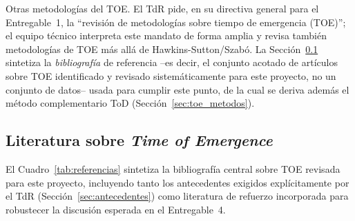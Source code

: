 \documentclass[11pt,a4paper]{article}
\begin{document}
Otras metodolog\'ias del TOE. El TdR pide, en su directiva general para el Entregable~1, la ``revisi\'on de metodolog\'ias sobre tiempo de emergencia (TOE)''; el equipo t\'ecnico interpreta este mandato de forma amplia y revisa tambi\'en metodolog\'ias de TOE m\'as all\'a de Hawkins-Sutton/Szab\'o. La Secci\'on~\ref{sec:referencias} sintetiza la \emph{bibliograf\'ia} de referencia --es decir, el conjunto acotado de art\'iculos sobre TOE identificado y revisado sistem\'aticamente para este proyecto, no un conjunto de datos-- usada para cumplir este punto, de la cual se deriva adem\'as el m\'etodo complementario ToD (Secci\'on~\ref{sec:toe_metodos}).

\subsection{Literatura sobre \emph{Time of Emergence}}
\label{sec:referencias}

El Cuadro~\ref{tab:referencias} sintetiza la bibliograf\'ia central sobre TOE revisada para este proyecto, incluyendo tanto los antecedentes exigidos expl\'icitamente por el TdR (Secci\'on~\ref{sec:antecedentes}) como literatura de refuerzo incorporada para robustecer la discusi\'on esperada en el Entregable~4.
\end{document}

